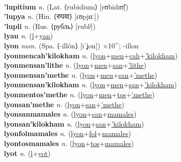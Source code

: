  \label{lutilum} \\
\textbf{'lupitium} \textit{n.} (Lat. ⟨rubidium⟩ [rʊbidɪʊ̃])
 \label{'lupitium} \\
\textbf{'lupya} \textit{n.} (Hin. ⟨रुपया⟩ [ɾʊpjɑː])
 \label{'lupya} \\
\textbf{'lupli} \textit{n.} (Rus. ⟨рубль⟩ [rublʲ])
 \label{'lupli} \\
\textbf{lyan} \textit{n.} (\hyperref[l]{l}+\hyperref[yan]{yan})
 \label{lyan} \\
\textbf{lyon} \textit{num.} (Spa. ⟨-illón⟩ [iˈʝon])
×10\textasciicircum{}; -illon \label{lyon} \\
\textbf{lyonmencah'kilokham} \textit{n.} (\hyperref[lyon]{lyon}+\hyperref[men]{men}+\hyperref[cah]{cah}+\hyperref['kilokham]{'kilokham})
 \label{lyonmencah'kilokham} \\
\textbf{lyonmensan'lithe} \textit{n.} (\hyperref[lyon]{lyon}+\hyperref[men]{men}+\hyperref[san]{san}+\hyperref['lithe]{'lithe})
 \label{lyonmensan'lithe} \\
\textbf{lyonmensan'methe} \textit{n.} (\hyperref[lyon]{lyon}+\hyperref[men]{men}+\hyperref[san]{san}+\hyperref['methe]{'methe})
 \label{lyonmensan'methe} \\
\textbf{lyonmensan'kilokham} \textit{n.} (\hyperref[lyon]{lyon}+\hyperref[men]{men}+\hyperref[san]{san}+\hyperref['kilokham]{'kilokham})
 \label{lyonmensan'kilokham} \\
\textbf{lyonmentos'methe} \textit{n.} (\hyperref[lyon]{lyon}+\hyperref[men]{men}+\hyperref[tos]{tos}+\hyperref['methe]{'methe})
 \label{lyonmentos'methe} \\
\textbf{lyonsan'methe} \textit{n.} (\hyperref[lyon]{lyon}+\hyperref[san]{san}+\hyperref['methe]{'methe})
 \label{lyonsan'methe} \\
\textbf{lyonsanmamales} \textit{n.} (\hyperref[lyon]{lyon}+\hyperref[san]{san}+\hyperref[mamales]{mamales})
 \label{lyonsanmamales} \\
\textbf{lyonsan'kilokham} \textit{n.} (\hyperref[lyon]{lyon}+\hyperref[san]{san}+\hyperref['kilokham]{'kilokham})
 \label{lyonsan'kilokham} \\
\textbf{lyonfolmamales} \textit{n.} (\hyperref[lyon]{lyon}+\hyperref[fol]{fol}+\hyperref[mamales]{mamales})
 \label{lyonfolmamales} \\
\textbf{lyontosmamales} \textit{n.} (\hyperref[lyon]{lyon}+\hyperref[tos]{tos}+\hyperref[mamales]{mamales})
 \label{lyontosmamales} \\
\textbf{lyot} \textit{n.} (\hyperref[l]{l}+\hyperref[yot]{yot})
